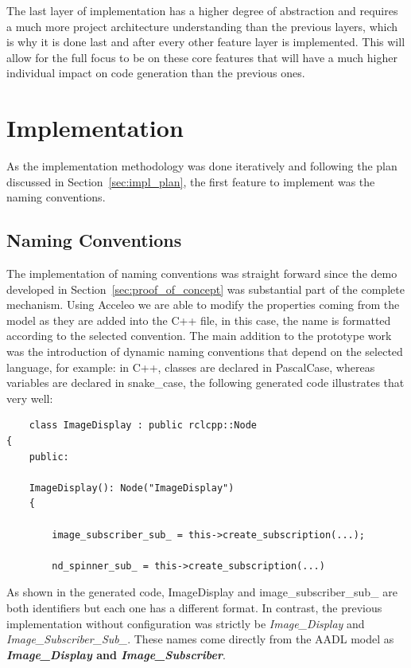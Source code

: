 The last layer of implementation has a higher degree of abstraction and requires a much more project architecture understanding than the previous layers, which is why it is done last and after every other feature layer is implemented. This will allow for the full focus to be on these core features that will have a much higher individual impact on code generation than the previous ones.

\section{Implementation}
\label{sec:implementation}


As the implementation methodology was done iteratively and following the plan discussed in Section~\ref{sec:impl_plan}, the first feature to implement was the naming conventions.

\subsection{Naming Conventions}
\label{sec:impl_name_conv}

The implementation of naming conventions was straight forward since the demo developed in Section~\ref{sec:proof_of_concept} was substantial part of the complete mechanism. Using Acceleo we are able to modify the properties coming from the model as they are added into the C++ file, in this case, the name is formatted according to the selected convention. The main addition to the prototype work was the introduction of dynamic naming conventions that depend on the selected language, for example: in C++, classes are declared in PascalCase, whereas variables are declared in snake\_case, the following generated code illustrates that very well:

\begin{verbatim}
	class ImageDisplay : public rclcpp::Node
{
	public:
	
	ImageDisplay(): Node("ImageDisplay")
	{
		
		image_subscriber_sub_ = this->create_subscription(...);
		
		nd_spinner_sub_ = this->create_subscription(...)
\end{verbatim}

As shown in the generated code, ImageDisplay and image\_subscriber\_sub\_ are both \glspl{identifier} but each one has a different format. In contrast, the previous implementation without configuration was strictly be \textit{Image\_Display} and \textit{Image\_Subscriber\_Sub\_}. These names come directly from the \gls{AADL} model as \textbf{\textit{Image\_Display} and \textit{Image\_Subscriber}}.

